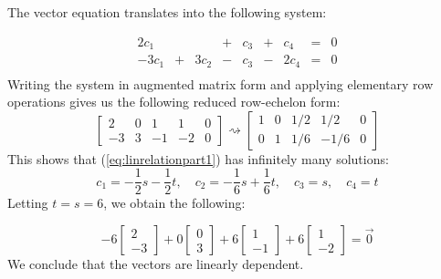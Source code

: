 \documentclass{ximera}
\begin{document}
\begin{example}
\begin{explanation}
The vector equation translates into the following system:

$$\begin{array}{ccccccccc}
      2c_1 & &&+&c_3&+&c_4&= &0 \\
        -3c_1& +&3c_2&-&c_3&-&2c_4&= &0 \\
      \end{array}$$
  Writing the system in augmented matrix form and applying elementary row operations gives us the following reduced row-echelon form:
  $$\left[\begin{array}{cccc|c}  
 2&0&1&1&0\\-3&3&-1&-2&0
 \end{array}\right]\rightsquigarrow\left[\begin{array}{cccc|c}  
 1&0&1/2&1/2&0\\0&1&1/6&-1/6&0
 \end{array}\right]$$
 This shows that (\ref{eq:linrelationpart1}) has infinitely many solutions:  
 $$c_1=-\frac{1}{2}s-\frac{1}{2}t,\quad c_2=-\frac{1}{6}s+\frac{1}{6}t,\quad c_3=s,\quad c_4=t$$
 Letting $t=s=6$, we obtain the following:
 
 \begin{equation}\label{eq:ex1}
 -6\begin{bmatrix}2\\-3\end{bmatrix}+0 \begin{bmatrix}0\\3\end{bmatrix}+6\begin{bmatrix}1\\-1\end{bmatrix}+6\begin{bmatrix}1\\-2\end{bmatrix}=\vec{0}
 \end{equation}
 We conclude that the vectors are linearly dependent.


\end{explanation}
\end{example}
\end{document}
